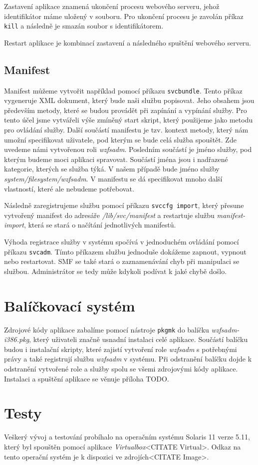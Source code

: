 Zastavení aplikace znamená ukončení procesu webového serveru, jehož identifikátor máme uložený v souboru. Pro ukončení procesu je zavolán příkaz \verb|kill| a následně je smazán soubor s identifikátorem.

Restart aplikace je kombinací zastavení a následného spuštění webového serveru.
\subsection{Manifest}
Manifest můžeme vytvořit například pomocí příkazu \verb|svcbundle|. Tento příkaz vygeneruje XML dokument, který bude naši službu popisovat. Jeho obsahem jsou především metody, které se budou provádět při zapínání a vypínání služby. Pro tento účel jsme vytvářeli výše zmíněný start skript, který použijeme jako metodu pro ovládání služby. Další součástí manifestu je tzv. kontext metody, který nám umožní specifikovat uživatele, pod kterým se bude celá služba spouštět. Zde uvedeme námi vytvořenou roli \emph{wzfsadm}. Posledním součástí je jméno služby, pod kterým budeme moci aplikaci spravovat. Součástí jména jsou i nadřazené kategorie, kterých se služba týká. V našem případě bude jméno služby \emph{system/filesystem/wzfsadm}. V manifestu se dá specifikovat mnoho další vlastností, které ale nebudeme potřebovat. 

Následně zaregistrujeme službu pomocí příkazu \verb|svccfg import|, který přesune vytvořený manifest do adresáře \emph{/lib/svc/manifest} a restartuje službu \emph{manifest-import}, která se stará o načítání jednotlivých manifestů.

Výhoda registrace služby v systému spočívá v jednoduchém ovládání pomocí příkazu \verb|svcadm|. Tímto příkazem službu jednoduše dokážeme zapnout, vypnout nebo restartovat.
SMF se také stará o zaznamenávání chyb při manipulaci se službou. Administrátor se tedy může kdykoli podívat k jaké chybě došlo.
\section{Balíčkovací systém}
Zdrojové kódy aplikace zabalíme pomocí nástroje \verb|pkgmk| do balíčku \emph{wzfsadm-i386.pkg}, který uživateli značně usnadní instalaci celé aplikace. Součástí balíčku budou i instalační skripty, které zajistí vytvoření role \emph{wzfsadm} s potřebnými právy a také registrují službu \emph{wzfsadm} v systému. Při odstranění balíčku dojde k odstranění vytvořené role a služby spolu se všemi zdrojovými kódy aplikace. Instalaci a spuštění aplikace se věnuje příloha TODO.
\section{Testy}
Veškerý vývoj a testování probíhalo na operačním systému Solaris 11 verze 5.11, který byl spouštěn pomocí aplikace \emph{Virtualbox}<CITATE Virtual>. Odkaz na tento operační systém je k dispozici ve zdrojích<CITATE Image>. 


